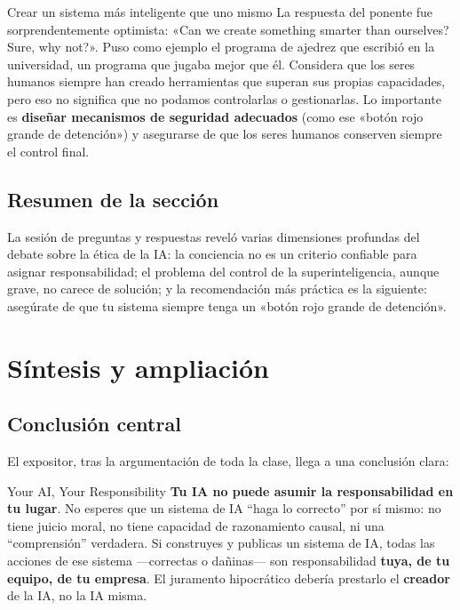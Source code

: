 \documentclass[a4paper]{article}
\begin{document}
\begin{knowledgebox}{Crear un sistema más inteligente que uno mismo}
La respuesta del ponente fue sorprendentemente optimista: «Can we create something smarter than ourselves? Sure, why not?». Puso como ejemplo el programa de ajedrez que escribió en la universidad, un programa que jugaba mejor que él. Considera que los seres humanos siempre han creado herramientas que superan sus propias capacidades, pero eso no significa que no podamos controlarlas o gestionarlas. Lo importante es \textbf{diseñar mecanismos de seguridad adecuados} (como ese «botón rojo grande de detención») y asegurarse de que los seres humanos conserven siempre el control final.
\end{knowledgebox}

\subsection{Resumen de la sección}

La sesión de preguntas y respuestas reveló varias dimensiones profundas del debate sobre la ética de la IA: la conciencia no es un criterio confiable para asignar responsabilidad; el problema del control de la superinteligencia, aunque grave, no carece de solución; y la recomendación más práctica es la siguiente: asegúrate de que tu sistema siempre tenga un «botón rojo grande de detención».
\section{Síntesis y ampliación}

\subsection{Conclusión central}

El expositor, tras la argumentación de toda la clase, llega a una conclusión clara:

\begin{importantbox}{{Your AI, Your Responsibility}}
\textbf{Tu IA no puede asumir la responsabilidad en tu lugar}. No esperes que un sistema de IA ``haga lo correcto'' por sí mismo: no tiene juicio moral, no tiene capacidad de razonamiento causal, ni una ``comprensión'' verdadera. Si construyes y publicas un sistema de IA, todas las acciones de ese sistema —correctas o dañinas— son responsabilidad \textbf{tuya, de tu equipo, de tu empresa}. El juramento hipocrático debería prestarlo el \textbf{creador} de la IA, no la IA misma.
\end{importantbox}
\end{document}
